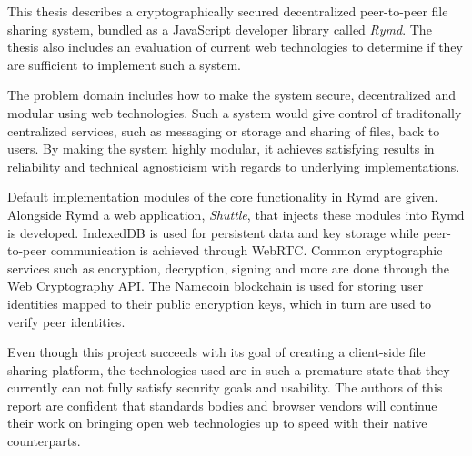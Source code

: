 %

This thesis describes a cryptographically secured decentralized peer-to-peer file sharing system, bundled as a JavaScript developer library called \emph{Rymd}. The thesis also includes an evaluation of current web technologies to determine if they are sufficient to implement such a system.

The problem domain includes how to make the system secure, decentralized and modular using web technologies. Such a system would give control of traditonally centralized services, such as messaging or storage and sharing of files, back to users. By making the system highly modular, it achieves satisfying results in reliability and technical agnosticism with regards to underlying implementations.

Default implementation modules of the core functionality in Rymd are given. Alongside Rymd a web application, \emph{Shuttle}, that injects these modules into Rymd is developed. IndexedDB is used for persistent data and key storage while peer-to-peer communication is achieved through WebRTC. Common cryptographic services such as encryption, decryption, signing and more are done through the Web Cryptography API. The Namecoin blockchain is used for storing user identities mapped to their public encryption keys, which in turn are used to verify peer identities.

Even though this project succeeds with its goal of creating a client-side file sharing platform, the technologies used are in such a premature state that they currently can not fully satisfy security goals and usability. The authors of this report are confident that standards bodies and browser vendors will continue their work on bringing open web technologies up to speed with their native counterparts.
